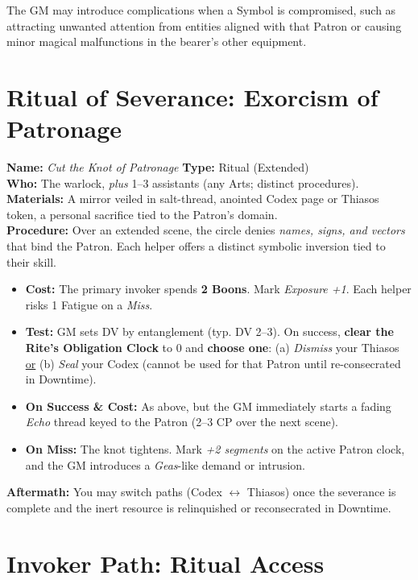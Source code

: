 \documentclass[12pt,twoside]{book}
\begin{document}
The GM may introduce complications when a Symbol is compromised, such as attracting unwanted attention from entities aligned with that Patron or causing minor magical malfunctions in the bearer's other equipment.

\bigskip

\section{Ritual of Severance: Exorcism of Patronage}
\label{subsec:exorcism}
\textbf{Name:} \emph{Cut the Knot of Patronage} \quad \textbf{Type:} Ritual (Extended) \\
\textbf{Who:} The warlock, \emph{plus} 1--3 assistants (any Arts; distinct procedures). \\
\textbf{Materials:} A mirror veiled in salt-thread, anointed Codex page or Thiasos token, a personal sacrifice tied to the Patron’s domain. \\
\textbf{Procedure:} Over an extended scene, the circle denies \emph{names, signs, and vectors} that bind the Patron. Each helper offers a distinct symbolic inversion tied to their skill.
\begin{itemize}
  \item \textbf{Cost:} The primary invoker spends \textbf{2 Boons}. Mark \emph{Exposure +1}. Each helper risks 1 Fatigue on a \emph{Miss}.
  \item \textbf{Test:} GM sets DV by entanglement (typ. DV 2–3). On success, \textbf{clear the Rite’s Obligation Clock} to 0 and \textbf{choose one}: (a) \emph{Dismiss} your Thiasos \underline{or} (b) \emph{Seal} your Codex (cannot be used for that Patron until re-consecrated in Downtime).
  \item \textbf{On Success \& Cost:} As above, but the GM immediately starts a fading \emph{Echo} thread keyed to the Patron (2–3 CP over the next scene).
  \item \textbf{On Miss:} The knot tightens. Mark \emph{+2 segments} on the active Patron clock, and the GM introduces a \emph{Geas}-like demand or intrusion.
\end{itemize}
\textbf{Aftermath:} You may switch paths (Codex $\leftrightarrow$ Thiasos) once the severance is complete and the inert resource is relinquished or reconsecrated in Downtime.


\section*{Invoker Path: Ritual Access}
\end{document}
